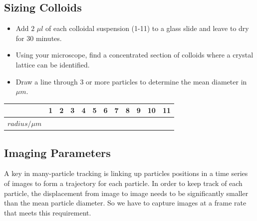 \documentclass[12pt,a4paper,twoside]{article}
\begin{document}
\subsection{Sizing Colloids}

\begin{itemize}
    \item Add $2$ $\mu l$ of each colloidal suspension (1-11) to a glass slide and leave to dry for $30$ minutes.
    \item Using your microscope, find a concentrated section of colloids where a crystal lattice can be identified.
    \item Draw a line through $3$ or more particles to determine the mean diameter in $\mu m$.
\end{itemize}

    \begin{center}    
        \begin{tabular}{ |c|c|c|c|c|c|c|c|c|c|c|c| } 
            \hline
            & 1 & 2 & 3 & 4 & 5 & 6 & 7 & 8 & 9 & 10 & 11\\
            \hline
            $radius/\mu m$ & \hspace{1cm}  &  \hspace{1cm}   &   \hspace{1cm}  & \hspace{1cm}   &   \hspace{1cm} &   \hspace{1cm} &  \hspace{1cm}  &   \hspace{1cm} &  \hspace{1cm}  &  \hspace{1cm}  &   \hspace{1cm} \\
            \hline
        \end{tabular}
    \end{center}


\subsection{Imaging Parameters}

A key in many-particle tracking is linking up particles positions in a time series of images to form a trajectory for each particle. In order to keep track of each particle, the displacement from image to image needs to be significantly smaller than the mean particle diameter. So we have to capture images at a frame rate that meets this requirement.
\end{document}
